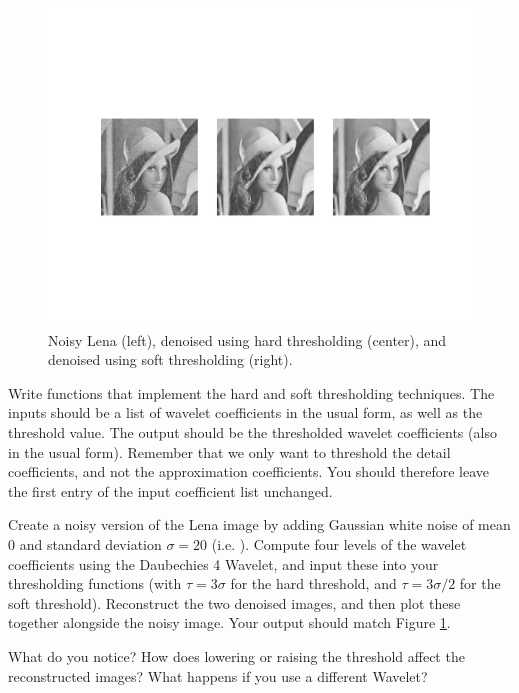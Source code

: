 \begin{figure}[t]
    \includegraphics[width=\linewidth]{denoise.pdf}
    \caption{Noisy Lena (left), denoised using hard thresholding (center), 
    and denoised using soft thresholding (right).}
    \label{fig:denoise}
\end{figure}

\begin{problem}
Write functions that implement the hard and soft thresholding
techniques. The inputs should be a list of wavelet coefficients
in the usual form, as well as the threshold value. The output
should be the thresholded wavelet coefficients (also in
the usual form). Remember that we only want to threshold the
detail coefficients, and not the approximation coefficients.
You should therefore leave the first entry of the input
coefficient list unchanged.
\end{problem}

\begin{problem}
Create a noisy version of the Lena image by adding Gaussian
white noise of mean 0 and standard deviation $\sigma = 20$ (i.e. ).
Compute four levels of the wavelet coefficients using the Daubechies 4 Wavelet, 
and input these into your
thresholding functions (with $\tau = 3\sigma$ for the hard threshold,
and $\tau = 3\sigma/2$ for the soft threshold). Reconstruct the
two denoised images, and then plot these together alongside the
noisy image. Your output should match Figure \ref{fig:denoise}.

What do you notice? How does lowering or raising the
threshold affect the reconstructed images? What happens if you use
a different Wavelet?
\end{problem}

